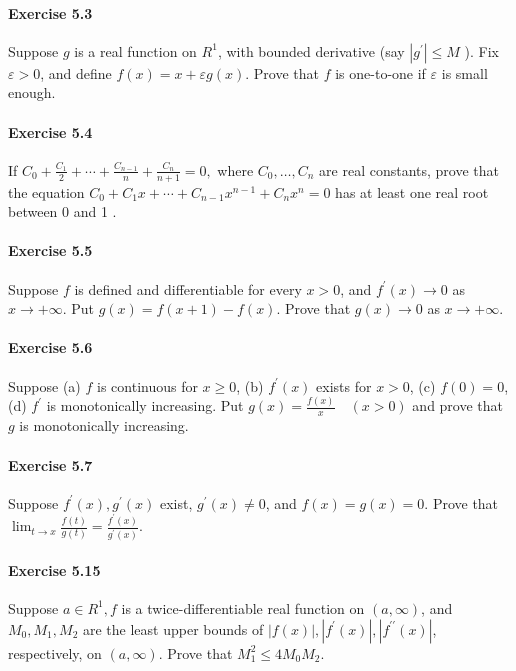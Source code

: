 \documentclass{article}
\begin{document}
\paragraph{Exercise 5.3} Suppose $g$ is a real function on $R^{1}$, with bounded derivative (say $\left|g^{\prime}\right| \leq M$ ). Fix $\varepsilon>0$, and define $f(x)=x+\varepsilon g(x)$. Prove that $f$ is one-to-one if $\varepsilon$ is small enough.

\paragraph{Exercise 5.4} If $C_{0}+\frac{C_{1}}{2}+\cdots+\frac{C_{n-1}}{n}+\frac{C_{n}}{n+1}=0,$ where $C_{0}, \ldots, C_{n}$ are real constants, prove that the equation $C_{0}+C_{1} x+\cdots+C_{n-1} x^{n-1}+C_{n} x^{n}=0$ has at least one real root between 0 and 1 .

\paragraph{Exercise 5.5} Suppose $f$ is defined and differentiable for every $x>0$, and $f^{\prime}(x) \rightarrow 0$ as $x \rightarrow+\infty$. Put $g(x)=f(x+1)-f(x)$. Prove that $g(x) \rightarrow 0$ as $x \rightarrow+\infty$.

\paragraph{Exercise 5.6} Suppose (a) $f$ is continuous for $x \geq 0$, (b) $f^{\prime}(x)$ exists for $x>0$, (c) $f(0)=0$, (d) $f^{\prime}$ is monotonically increasing. Put $g(x)=\frac{f(x)}{x} \quad(x>0)$ and prove that $g$ is monotonically increasing.

\paragraph{Exercise 5.7} Suppose $f^{\prime}(x), g^{\prime}(x)$ exist, $g^{\prime}(x) \neq 0$, and $f(x)=g(x)=0$. Prove that $\lim _{t \rightarrow x} \frac{f(t)}{g(t)}=\frac{f^{\prime}(x)}{g^{\prime}(x)}.$

\paragraph{Exercise 5.15} Suppose $a \in R^{1}, f$ is a twice-differentiable real function on $(a, \infty)$, and $M_{0}, M_{1}, M_{2}$ are the least upper bounds of $|f(x)|,\left|f^{\prime}(x)\right|,\left|f^{\prime \prime}(x)\right|$, respectively, on $(a, \infty)$. Prove that $M_{1}^{2} \leq 4 M_{0} M_{2} .$
\end{document}
